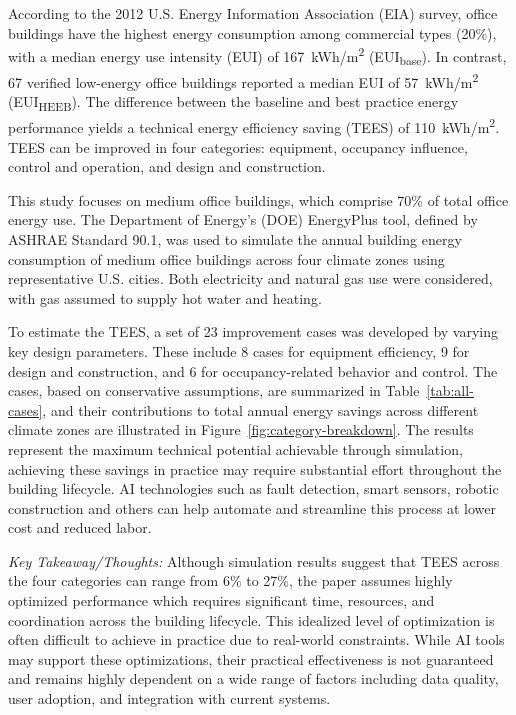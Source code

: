 \documentclass[conference,a4paper]{IEEEtran}
\begin{document}
According to the 2012 U.S. Energy Information Association (EIA) survey, office buildings have the highest energy consumption among commercial types (20\%), with a median energy use intensity (EUI) of 167~kWh/m\textsuperscript{2} (EUI\textsubscript{base}). In contrast, 67 verified low-energy office buildings reported a median EUI of 57~kWh/m\textsuperscript{2} (EUI\textsubscript{HEEB}). The difference between the baseline and best practice energy performance yields a technical energy efficiency saving (TEES) of 110~kWh/m\textsuperscript{2}. TEES can be improved in four categories: equipment, occupancy influence, control and operation, and design and construction.

This study focuses on medium office buildings, which comprise 70\% of total office energy use. The Department of Energy's (DOE) EnergyPlus tool, defined by ASHRAE Standard 90.1, was used to simulate the annual building energy consumption of medium office buildings across four climate zones using representative U.S. cities. Both electricity and natural gas use were considered, with gas assumed to supply hot water and heating. 

To estimate the TEES, a set of 23 improvement cases was developed by varying key design parameters. These include 8 cases for equipment efficiency, 9 for design and construction, and 6 for occupancy-related behavior and control. The cases, based on conservative assumptions, are summarized in Table~\ref{tab:all-cases}, and their contributions to total annual energy savings across different climate zones are illustrated in Figure~\ref{fig:category-breakdown}. The results represent the maximum technical potential achievable through simulation, achieving these savings in practice may require substantial effort throughout the building lifecycle. AI technologies such as fault detection, smart sensors, robotic construction and others can help automate and streamline this process at lower cost and reduced labor.

\textit{Key Takeaway/Thoughts:} Although simulation results suggest that TEES across the four categories can range from 6\% to 27\%, the paper assumes highly optimized performance which requires significant time, resources, and coordination across the building lifecycle. This idealized level of optimization is often difficult to achieve in practice due to real-world constraints. While AI tools may support these optimizations, their practical effectiveness is not guaranteed and remains highly dependent on a wide range of factors including data quality, user adoption, and integration with current systems.
\end{document}
